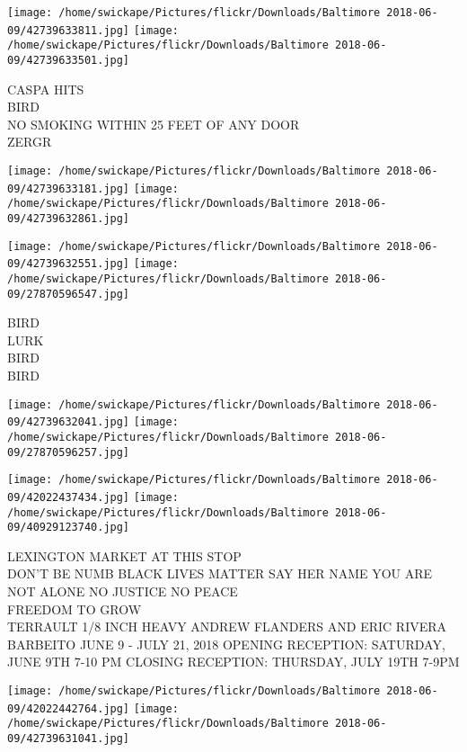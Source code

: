 \documentclass[10pt,letterpaper]{article}
\begin{document}
\texttt{[image: /home/swickape/Pictures/flickr/Downloads/Baltimore 2018-06-09/42739633811.jpg]}
\texttt{[image: /home/swickape/Pictures/flickr/Downloads/Baltimore 2018-06-09/42739633501.jpg]}

CASPA HITS\\
BIRD\\
NO SMOKING WITHIN 25 FEET OF ANY DOOR\\
ZERGR\\
\pagebreak

\texttt{[image: /home/swickape/Pictures/flickr/Downloads/Baltimore 2018-06-09/42739633181.jpg]}
\texttt{[image: /home/swickape/Pictures/flickr/Downloads/Baltimore 2018-06-09/42739632861.jpg]}

\texttt{[image: /home/swickape/Pictures/flickr/Downloads/Baltimore 2018-06-09/42739632551.jpg]}
\texttt{[image: /home/swickape/Pictures/flickr/Downloads/Baltimore 2018-06-09/27870596547.jpg]}

BIRD\\
LURK\\
BIRD\\
BIRD\\
\pagebreak

\texttt{[image: /home/swickape/Pictures/flickr/Downloads/Baltimore 2018-06-09/42739632041.jpg]}
\texttt{[image: /home/swickape/Pictures/flickr/Downloads/Baltimore 2018-06-09/27870596257.jpg]}

\texttt{[image: /home/swickape/Pictures/flickr/Downloads/Baltimore 2018-06-09/42022437434.jpg]}
\texttt{[image: /home/swickape/Pictures/flickr/Downloads/Baltimore 2018-06-09/40929123740.jpg]}

LEXINGTON MARKET AT THIS STOP\\
DON'T BE NUMB BLACK LIVES MATTER SAY HER NAME YOU ARE NOT ALONE NO JUSTICE NO PEACE\\
FREEDOM TO GROW\\
TERRAULT 1/8 INCH HEAVY ANDREW FLANDERS AND ERIC RIVERA BARBEITO JUNE 9 {-} JULY 21, 2018 OPENING RECEPTION: SATURDAY, JUNE 9TH 7{-}10 PM CLOSING RECEPTION: THURSDAY, JULY 19TH 7{-}9PM\\
\pagebreak

\texttt{[image: /home/swickape/Pictures/flickr/Downloads/Baltimore 2018-06-09/42022442764.jpg]}
\texttt{[image: /home/swickape/Pictures/flickr/Downloads/Baltimore 2018-06-09/42739631041.jpg]}
\end{document}
